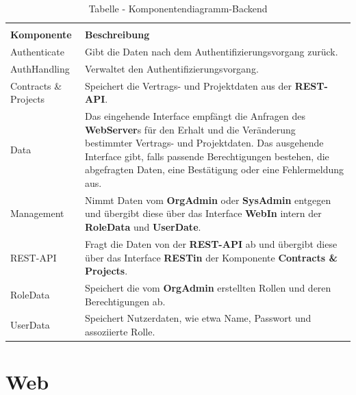 \begin{longtable}[h]{p{4cm} p{10.0cm}}
	\caption{Tabelle - Komponentendiagramm-Backend}
	\centering
	\label{tab:table_comp_backend}
	\endlastfoot
	\multicolumn{2}{r}{{Weitergeführt auf der folgenden Seite}} \\
	\endfoot
	\endhead
	\rowcolor[HTML]{C0C0C0} 
	\textbf{Komponente} & \textbf{Beschreibung} \\ 
	
	Authenticate & Gibt die Daten nach dem Authentifizierungsvorgang zurück. \\
	
	\rowcolor[HTML]{E7E7E7} 
	AuthHandling & Verwaltet den Authentifizierungsvorgang.  \\
	
	Contracts {\&} Projects & Speichert die Vertrags- und Projektdaten aus der \textbf{REST-API}. \\
	
	\rowcolor[HTML]{E7E7E7} 
	Data & Das eingehende Interface empfängt die Anfragen des \textbf{WebServer}s für den Erhalt und die Veränderung bestimmter Vertrags- und Projektdaten. Das ausgehende Interface gibt, falls passende Berechtigungen bestehen, die abgefragten Daten, eine Bestätigung oder eine Fehlermeldung aus.  \\
	
	Management & Nimmt Daten vom \textbf{OrgAdmin} oder \textbf{SysAdmin} entgegen und übergibt diese über das Interface \textbf{WebIn} intern der \textbf{RoleData} und \textbf{UserDate}. \\
	
	\rowcolor[HTML]{E7E7E7} 
	REST-API & Fragt die Daten von der \textbf{REST-API} ab und übergibt diese über das Interface \textbf{RESTin} der Komponente \textbf{Contracts {\&} Projects}. \\
	
	RoleData & Speichert die vom \textbf{OrgAdmin} erstellten Rollen und deren Berechtigungen ab. \\
	
	\rowcolor[HTML]{E7E7E7} 
	UserData & Speichert Nutzerdaten, wie etwa Name, Passwort und assoziierte Rolle.
\end{longtable}

\clearpage

\section{Web}


